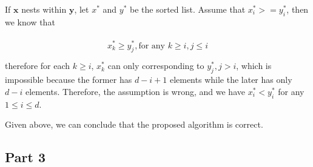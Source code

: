 \documentclass{article}
\begin{document}
If $\mathbf{x}$ nests within $\mathbf{y}$, let $x^*$ and $y^*$ be the sorted list. Assume that
$x^*_i >= y^*_i$, then we know that 

\begin{align}
  \begin{split}  
  x^*_k \geq y^*_j, \text{for any } k \geq i, j \leq i  \\
  \end{split}
\end{align}
therefore for each $k \geq i$, $x^*_k$ can only corresponding to $y^*_j, j > i$, which is impossible
because the former has $d - i + 1$ elements while the later has only $d-i$ elements. Therefore,
the assumption is wrong, and we have $x^*_i < y^*_i$ for any $1 \leq i \leq d$.

Given above, we can conclude that the proposed algorithm is correct.

\subsection*{Part 3}
\end{document}
